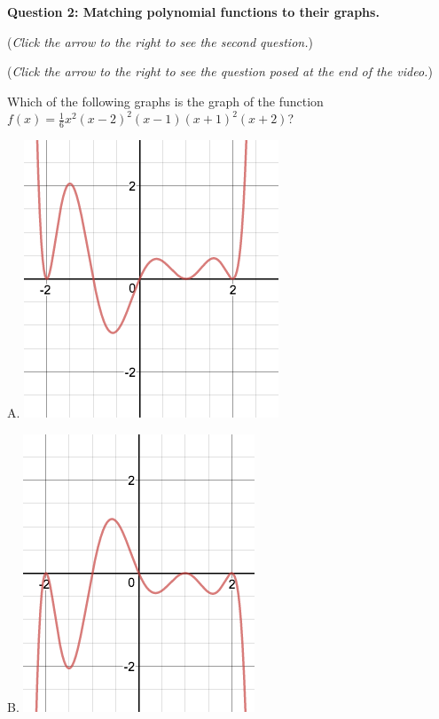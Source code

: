 \documentclass{ximera}
\begin{document}
\textbf{Question 2: Matching polynomial functions to their graphs.}
\begin{question}
\begin{flushright}
{\color{blue}(\emph{Click the arrow to the right to see the second question.})}
\end{flushright}
\begin{center}
\begin{expandable}
\begin{flushright}
{\color{blue}(\emph{Click the arrow to the right to see the  question
posed at the end of the video.})}
\end{flushright}
\begin{expandable}
Which of the following graphs is the graph of the function $f(x) = \frac{1}{6}x^2(x-2)^2(x-1)(x+1)^2(x+2)$?

\begin{multicols}{3}
\begin{center}
A. \includegraphics[scale=0.25]{Graph1}
\end{center}

\begin{center}
B. \includegraphics[scale=0.25]{Graph2}
\end{center}
 

\end{multicols}
\end{expandable}
\end{expandable}
\end{center}
\end{question}
\end{document}
